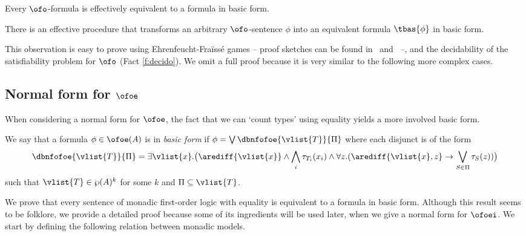 \medskip

\noindent
Every $\ofo$-formula is effectively equivalent to a formula in basic form.

\begin{fact}\label{fact:ofonormalform}
There is an effective procedure that transforms an arbitrary $\ofo$-sentence 
$\phi$ into an equivalent formula $\tbas{\phi}$ in basic form.
\end{fact}

This observation is easy to prove using Ehrenfeucht-Fra\"iss\'e games -- proof
sketches can be found in~\cite[Lemma 16.23]{ALG02} 
and~\cite[Proposition 4.14]{Venema2014} --, and the decidability of the satisfiability problem for $\ofo$ (Fact \ref{f:decido}). 
We omit a full proof because it is very similar to the following more complex 
cases.



\subsection{Normal form for $\ofoe$}

When considering a normal form for $\ofoe$, the fact that we can `count types'
using equality yields a more involved basic form.



\begin{definition}%
We say that a formula $\phi \in \ofoe(A)$ is in \emph{basic form} if
$\phi = \bigvee \dbnfofoe{\vlist{T}}{\Pi}$ where each disjunct is of the
form
\begin{equation*}%
\dbnfofoe{\vlist{T}}{\Pi} = 
\exists \vlist{x}.\big(\arediff{\vlist{x}} \land \bigwedge_i \tau_{T_i}(x_i) 
  \land \forall z.(\arediff{\vlist{x},z} 
  \to \bigvee_{S\in \Pi} \tau_S(z))\big)
\end{equation*}
%
such that $\vlist{T} \in \wp(A)^k$ for some $k$ and $\Pi \subseteq \vlist{T}$.
\end{definition}

We prove that every sentence of monadic first-order logic with equality is
equivalent to a formula in basic form. 
Although this result seems to be folklore, we provide a detailed proof because 
some of its ingredients will be used later, when we give a normal form for 
$\ofoei$. 
We start by defining the following relation between monadic models.

